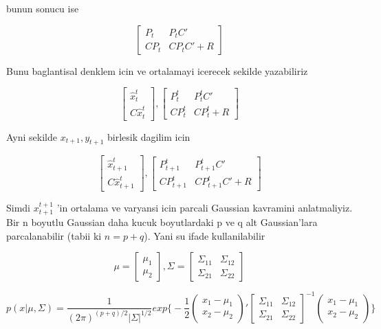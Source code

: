 \documentclass[12pt,fleqn]{article}
\begin{document}
bunun sonucu ise

\[ 
\left[\begin{array}{rr}
P_t & P_t C' \\
CP_t & CP_tC' + R
\end{array}\right]
 \]

Bunu baglantisal denklem icin ve ortalamayi icerecek sekilde yazabiliriz

\[ 
\left[\begin{array}{r}
\hat{x}_t^t \\
C\hat{x}_t^t
\end{array}\right] 
, 
\left[\begin{array}{rr}
P_t^t & P_t^tC' \\
CP_t^t & CP_t^t + R
\end{array}\right]
 \]

Ayni sekilde $x_{t+1} , y_{t+1}$ birlesik dagilim icin

\begin{equation}\label{eq1}
\left[\begin{array}{r}
\hat{x}_{t+1}^t \\
C\hat{x}_{t+1}^t
\end{array}\right], 
\left[\begin{array}{rr}
P_{t+1}^t & P_{t+1}^tC' \\
CP_{t+1}^t & CP_{t+1}^tC' + R
\end{array}\right]
\end{equation}

Simdi $x_{t+1}^{t+1}$ 'in ortalama ve varyansi icin parcali Gaussian kavramini
anlatmaliyiz. Bir n boyutlu Gaussian daha kucuk boyutlardaki p ve q alt
Gaussian'lara parcalanabilir (tabii ki $n = p + q$). Yani su ifade
kullanilabilir

\begin{equation}\label{eq2}
\mu = 
\left[\begin{array}{r}
\mu_1 \\ \mu_2
\end{array}\right], 
\Sigma = 
\left[\begin{array}{rr}
\Sigma_{11} & \Sigma_{12} \\
\Sigma_{21} & \Sigma_{22} 
\end{array}\right]
\end{equation}

\[ 
p(x|\mu,\Sigma) = 
\frac{1}{(2\pi)^{(p+q)/2}|\Sigma|^{1/2}}
exp \bigg\{ 
-\frac{1}{2} 
\left(\begin{array}{rr}
x_1 - \mu_1 \\
x_2 - \mu_2 
\end{array}\right)'
\left[\begin{array}{rr}
\Sigma_{11} & \Sigma_{12} \\
\Sigma_{21} & \Sigma_{22} 
\end{array}\right]^{-1}
\left(\begin{array}{rr}
x_1 - \mu_1 \\
x_2 - \mu_2 
\end{array}\right)
\bigg\}
 \]
\end{document}
